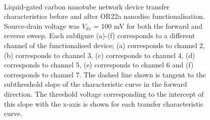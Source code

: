 \documentclass[
  a4paper,
]{scrbook}
\begin{document}
\begin{figure}
\begin{minipage}[t]{0.45\linewidth}
{{}

}

\end{minipage}%
%
\begin{minipage}[t]{0.01\linewidth}

{\centering 

~

}

\end{minipage}%

\caption{\label{fig-OR22a-variability-TX}Liquid-gated carbon nanotube
network device transfer characteristics before and after OR22a nanodisc
functionalisation. Source-drain voltage was \(V_{ds}\) = 100 mV for both
the forward and reverse sweep. Each subfigure (a)-(f) corresponds to a
different channel of the functionalised device; (a) corresponds to
channel 2, (b) corresponds to channel 3, (c) corresponds to channel 4,
(d) corresponds to channel 5, (e) corresponds to channel 6 and (f)
corresponds to channel 7. The dashed line shown is tangent to the
subthreshold slope of the characteristic curve in the forward direction.
The threshold voltage corresponding to the intercept of this slope with
the x-axis is shown for each transfer characteristic curve.}

\end{figure}
\end{document}

